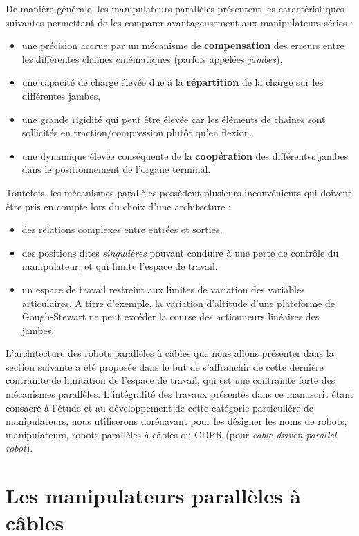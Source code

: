 De manière générale, les manipulateurs parallèles présentent les caractéristi\-ques sui\-vantes permettant de les comparer avantageusement aux manipulateurs séries :
\begin{itemize}
 \item une précision accrue par un mécanisme de {\bf compensation} des erreurs entre les différentes chaînes cinématiques (parfois appelées {\it jambes}),
 \item une capacité de charge élevée due à la {\bf répartition} de la charge sur les différentes jambes,
 \item une grande rigidité qui peut être élevée car les éléments de chaînes sont sollicités en traction/compression plutôt qu'en flexion.
 \item une dynamique élevée conséquente de la {\bf coopération} des différentes jam\-bes dans le positionnement de l'organe terminal.
\end{itemize}

Toutefois, les mécanismes parallèles possèdent plusieurs inconvénients qui doivent être pris en compte lors du choix d'une architecture :
\begin{itemize}
 \item des relations complexes entre entrées et sorties,
 \item des positions dites {\it singulières} pouvant conduire à une perte de contrôle du manipulateur, et qui limite l'espace de travail.
 \item un espace de travail restreint aux limites de variation des variables articulaires. A titre d'exemple, la variation d'altitude d'une plateforme de Gough-Stewart ne peut excéder la course des actionneurs linéaires des jambes.
\end{itemize}

L'architecture des robots parallèles à c\^ables que nous allons présenter dans la section suivante a été proposée dans le but de s'affranchir de cette dernière contrainte de limitation de l'espace de travail, qui est une contrainte forte des mécanismes parallèles.  L'intégralité des travaux présentés dans ce manuscrit étant consacré à l'étude et au développement de cette catégorie particulière de manipulateurs, nous utiliserons dorénavant pour les désigner les noms de robots, manipulateurs, robots parallèles à câbles ou CDPR (pour {\it cable-driven parallel robot}).

\section{Les manipulateurs parallèles à câbles}

